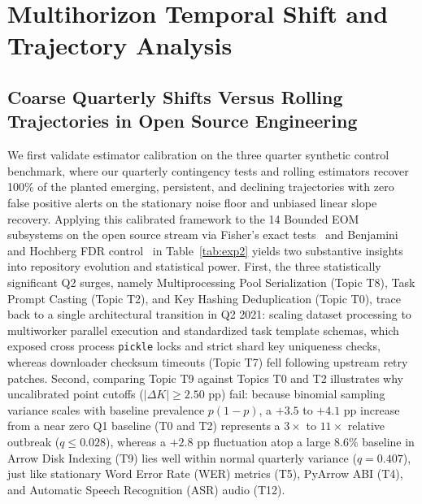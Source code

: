 \documentclass[sigconf,anonymous,pbalance]{acmart}
\begin{document}
\section{Multihorizon Temporal Shift and Trajectory Analysis}

\subsection{Coarse Quarterly Shifts Versus Rolling Trajectories in Open Source Engineering}
We first validate estimator calibration on the three quarter synthetic control benchmark, where our quarterly contingency tests and rolling estimators recover 100\% of the planted emerging, persistent, and declining trajectories with zero false positive alerts on the stationary noise floor and unbiased linear slope recovery. Applying this calibrated framework to the 14 Bounded EOM subsystems on the open source stream via Fisher's exact tests~\cite{fisher1922interpretation} and Benjamini and Hochberg FDR control~\cite{benjamini1995controlling} in Table~\ref{tab:exp2} yields two substantive insights into repository evolution and statistical power. First, the three statistically significant Q2 surges, namely Multiprocessing Pool Serialization (Topic T8), Task Prompt Casting (Topic T2), and Key Hashing Deduplication (Topic T0), trace back to a single architectural transition in Q2 2021: scaling dataset processing to multiworker parallel execution and standardized task template schemas, which exposed cross process \texttt{pickle} locks and strict shard key uniqueness checks, whereas downloader checksum timeouts (Topic T7) fell following upstream retry patches. Second, comparing Topic T9 against Topics T0 and T2 illustrates why uncalibrated point cutoffs ($|\Delta K| \ge 2.50$ pp) fail: because binomial sampling variance scales with baseline prevalence $p(1-p)$, a $+3.5$ to $+4.1$ pp increase from a near zero Q1 baseline (T0 and T2) represents a $3\times$ to $11\times$ relative outbreak ($q \le 0.028$), whereas a $+2.8$ pp fluctuation atop a large $8.6\%$ baseline in Arrow Disk Indexing (T9) lies well within normal quarterly variance ($q = 0.407$), just like stationary Word Error Rate (WER) metrics (T5), PyArrow ABI (T4), and Automatic Speech Recognition (ASR) audio (T12).
\end{document}
